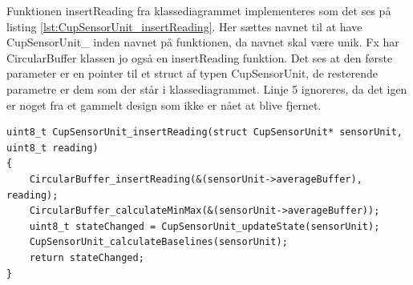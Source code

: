 \documentclass[Softwaredesign/Softwaredesign_main.tex]{subfiles}
\begin{document}
Funktionen insertReading fra klassediagrammet implementeres som det ses på listing \ref{lst:CupSensorUnit_insertReading}. Her sættes navnet til at have CupSensorUnit\_ inden navnet på funktionen, da navnet skal være unik. Fx har CircularBuffer klassen jo også en insertReading funktion. Det ses at den første parameter er en pointer til et struct af typen CupSensorUnit, de resterende parametre er dem som der står i klassediagrammet. Linje 5 ignoreres, da det igen er noget fra et gammelt design som ikke er nået at blive fjernet.

\begin{lstlisting}[caption={Eksempel på insertReading funktion},style=customc,label={lst:CupSensorUnit_insertReading}]
uint8_t CupSensorUnit_insertReading(struct CupSensorUnit* sensorUnit, uint8_t reading)
{
    CircularBuffer_insertReading(&(sensorUnit->averageBuffer), reading);
    CircularBuffer_calculateMinMax(&(sensorUnit->averageBuffer));
    uint8_t stateChanged = CupSensorUnit_updateState(sensorUnit);
    CupSensorUnit_calculateBaselines(sensorUnit);
    return stateChanged;
}
\end{lstlisting}
\end{document}
